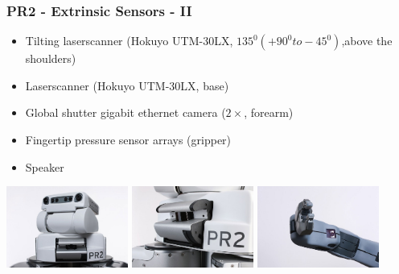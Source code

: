 \begin{frame}
  \frametitle{PR2 - Extrinsic Sensors - II}
\begin{itemize}
    \item Tilting laserscanner (Hokuyo UTM-30LX, $135^0 (+90^0 to -45^0)$,above the shoulders)
    \item Laserscanner (Hokuyo UTM-30LX, base)
    \item Global shutter gigabit ethernet camera ($2\times$, forearm)
    \item Fingertip pressure sensor arrays (gripper)
    \item Speaker
\end{itemize}
\hspace{-4ex}
\includegraphics[width=4cm]{images/head_tiltLRF.jpg} 
\includegraphics[width=4cm]{images/tilted_lrf.jpg}
\includegraphics[width=4cm]{images/pr2_hand_camera.jpg}  
\end{frame}
